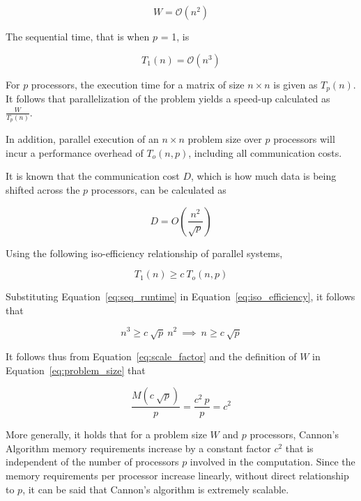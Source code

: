 \documentclass[fleqn,10pt]{SelfArx} %
\begin{document}
\begin{equation}
	W = \mathcal{O}(n^2)
	\label{eq:problem_size}
\end{equation}

The sequential time, that is when $p$ = 1, is 

\begin{equation}
	T_1(n) = \mathcal{O}(n^3)
	\label{eq:seq_runtime}
\end{equation}

For $p$ processors, the execution time for a matrix of size $n \times n$ is given as $T_p (n)$. It follows that parallelization of the problem yields a speed-up calculated as $\frac{W}{T_p (n)}$. 

In addition, parallel execution of an $n \times n$ problem size over $p$ processors will incur a performance overhead of $T_o(n, p)$, including all communication costs. 

It is known that the communication cost $D$, which is how much data is being shifted across the $p$ processors, can be calculated as 

\begin{equation}
	D = O(\frac{n^2}{\sqrt{p}})
\end{equation}

\noindent Using the following iso-efficiency relationship of parallel systems,  

\begin{equation}
	T_1(n) \geq c \ T_o(n, p)
	\label{eq:iso_efficiency}
\end{equation}

\noindent Substituting Equation~\eqref{eq:seq_runtime} in Equation~\eqref{eq:iso_efficiency}, it follows that

\begin{equation}
	n^3 \geq c \ \sqrt{p} \ n^2 \ \implies \ n \geq c \ \sqrt{p}
	\label{eq:scale_factor}
\end{equation}

\noindent It follows thus from Equation~\eqref{eq:scale_factor} and the definition of $W$ in Equation~\eqref{eq:problem_size} that

\begin{equation}
	\frac{M(c \ \sqrt{p})}{p} = \frac{c^2 \ p}{p} = c^2
\end{equation}

More generally, it holds that for a problem size $W$ and $p$ processors, Cannon's Algorithm memory requirements increase by a constant factor $c^2$ that is independent of the number of processors $p$ involved in the computation.  Since the memory requirements per processor increase linearly, without direct relationship to $p$, it can be said that Cannon's algorithm is extremely scalable. 
\end{document}
